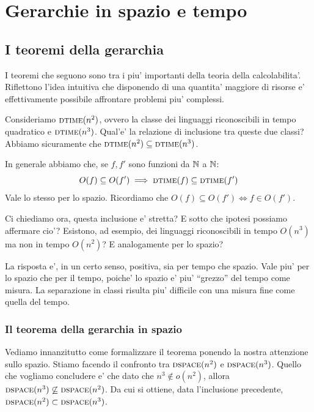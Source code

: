 \chapter{Gerarchie in spazio e tempo}


\section{I teoremi della gerarchia}

I teoremi che seguono sono tra i piu' importanti della teoria della calcolabilita'. Riflettono
l'idea intuitiva che disponendo di una quantita' maggiore di risorse e' effettivamente possibile
affrontare problemi piu' complessi.

Consideriamo $\textsc{dtime}(n^{2})$, ovvero la classe dei linguaggi riconoscibili in tempo quadratico e
$\textsc{dtime}(n^{3})$. Qual'e' la relazione di inclusione tra queste due classi? Abbiamo sicuramente che
$\textsc{dtime}(n^{2}) \subseteq \textsc{dtime}(n^{3})$.

In generale abbiamo che, se $f,f'$ sono funzioni da $\mathbb{N}$ a $\mathbb{N}$:
\begin{equation*}
    O(f) \subseteq O(f') \implies \textsc{dtime}(f) \subseteq \textsc{dtime}(f')
\end{equation*}
Vale lo stesso per lo spazio. Ricordiamo che $O(f) \subseteq O(f') \iff f \in O(f')$.

Ci chiediamo ora, questa inclusione e' stretta? E sotto che ipotesi possiamo affermare cio'?
Esistono, ad esempio, dei linguaggi riconoscibili in tempo $O(n^{3})$ ma non in tempo $O(n^{2})$? E
analogamente per lo spazio?

La risposta e', in un certo senso, positiva, sia per tempo che spazio. Vale piu' per lo spazio che
per il tempo, poiche' lo spazio e' piu' ``grezzo'' del tempo come misura. La separazione in classi
risulta piu' difficile con una misura fine come quella del tempo.

\subsection{Il teorema della gerarchia in spazio}

Vediamo innanzitutto come formalizzare il teorema ponendo la nostra attenzione sullo spazio.  Stiamo
facendo il confronto tra $\textsc{dspace}(n^{2})$ e $\textsc{dspace}(n^{3})$. Quello che vogliamo concludere e' che
dato che $n^{3} \notin o(n^{2})$, allora $\textsc{dspace}(n^{3}) \not\subseteq \textsc{dspace}(n^{2})$. Da cui si
ottiene, data l'inclusione precedente, $\textsc{dspace}(n^{2}) \subset \textsc{dspace}(n^{3})$.

